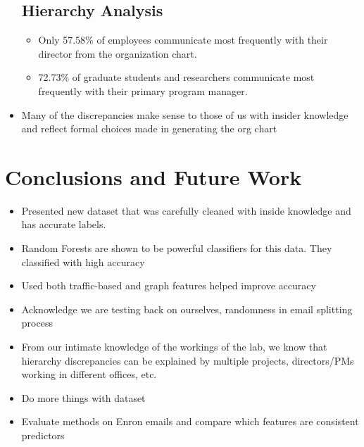 \documentclass{article}
\begin{document}
\begin{itemize}
\subsection{Hierarchy Analysis}
    \begin{itemize}
    \item Only 57.58\% of employees communicate most frequently with their director from the organization chart.
    \item 72.73\% of graduate students and researchers communicate most frequently with their primary program manager.
    \end{itemize}
\item Many of the discrepancies make sense to those of us with insider knowledge and reflect formal choices made in generating the org chart

\end{itemize}



\section{Conclusions and Future Work} \label{Conclusions}
\begin{itemize}
\item Presented new dataset that was carefully cleaned with inside knowledge and has accurate labels.
\item Random Forests are shown to be powerful classifiers for this data.  They classified with high accuracy
\item Used both traffic-based and graph features helped improve accuracy
\item Acknowledge we are testing back on ourselves, randomness in email splitting process
\item From our intimate knowledge of the workings of the lab, we know that hierarchy discrepancies can be explained by multiple projects, directors/PMs working in different offices, etc.
\item Do more things with dataset
\item Evaluate methods on Enron emails and compare which features are consistent predictors
\end{itemize}


\newpage

\end{document}
